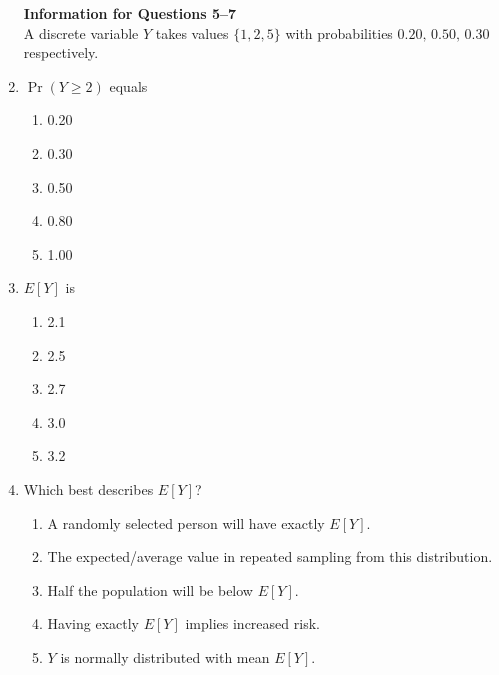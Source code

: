 \documentclass{article}
\begin{document}
\begin{enumerate}
\textbf{Information for Questions 5--7}\\
A discrete variable $Y$ takes values $\{1,2,5\}$ with probabilities $0.20,\,0.50,\,0.30$ respectively.
\item $\Pr(Y\ge 2)$ equals
    \begin{enumerate}[label=\Alph*.]
        \item 0.20
        \item 0.30
        \item 0.50
        \item 0.80
        \item 1.00
    \end{enumerate}
\item $E[Y]$ is
    \begin{enumerate}[label=\Alph*.]
        \item 2.1
        \item 2.5
        \item 2.7
        \item 3.0
        \item 3.2
    \end{enumerate}
\item Which best describes $E[Y]$?
    \begin{enumerate}[label=\Alph*.]
        \item A randomly selected person will have exactly $E[Y]$.
        \item The expected/average value in repeated sampling from this distribution.
        \item Half the population will be below $E[Y]$.
        \item Having exactly $E[Y]$ implies increased risk.
        \item $Y$ is normally distributed with mean $E[Y]$.
    \end{enumerate}


\end{enumerate}
\end{document}
